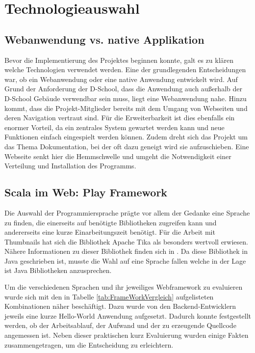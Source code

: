 \section{Technologieauswahl}
\subsection{Webanwendung vs. native Applikation}
Bevor die Implementierung des Projektes beginnen konnte, galt es zu klären welche Technologien verwendet werden. Eine der grundlegenden Entscheidungen war, ob ein Webanwendung oder eine native Anwendung entwickelt wird. Auf Grund der Anforderung der D-School, dass die Anwendung auch außerhalb der D-School Gebäude verwendbar sein muss, liegt eine Webanwendung nahe. Hinzu kommt, dass die Projekt-Mitglieder bereits mit dem Umgang von Webseiten und deren Navigation vertraut sind. Für die Erweiterbarkeit ist dies ebenfalls ein enormer Vorteil, da ein zentrales System gewartet werden kann und neue Funktionen einfach eingespielt werden können. Zudem dreht sich das Projekt um das Thema Dokumentation, bei der oft dazu geneigt wird sie aufzuschieben. Eine Webseite senkt hier die Hemmschwelle und umgeht die Notwendigkeit einer Verteilung und Installation des Programms.

\subsection{Scala im Web: Play Framework}
\FloatBarrier
Die Auswahl der Programmiersprache prägte vor allem der Gedanke eine Sprache zu finden, die einerseits auf benötigte Bibliotheken zugreifen kann und andererseits eine kurze Einarbeitungszeit benötigt. Für die Arbeit mit Thumbnails hat sich die Bibliothek Apache Tika als besonders wertvoll erwiesen. Nähere Informationen zu dieser Bibliothek finden sich in \cite{bp-dome}. Da diese Bibliothek in Java geschrieben ist, musste die Wahl auf eine Sprache fallen welche in der Lage ist Java Bibliotheken anzusprechen. 

Um die verschiedenen Sprachen und ihr jeweiliges Webframework zu evaluieren wurde sich mit den in Tabelle \ref{tab:FrameWorkVergleich} aufgelisteten Kombinationen näher beschäftigt. Dazu wurde von den Backend-Entwicklern jeweils eine kurze Hello-World Anwendung aufgesetzt. Dadurch konnte festgestellt werden, ob der Arbeitsablauf, der Aufwand und der zu erzeugende Quellcode angemessen ist. Neben dieser praktischen kurz Evaluierung wurden einige Fakten zusammengetragen, um die Entscheidung zu erleichtern.

